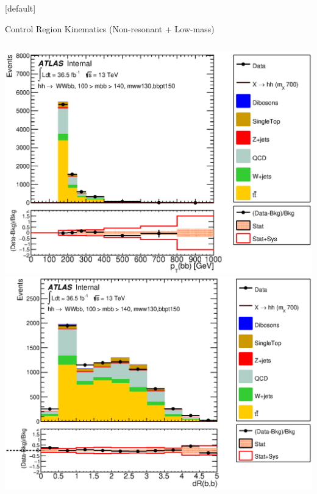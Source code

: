 \documentclass{beamer}
\begin{document}
{  \makeatletter %
  [default]
  \def\beamer@entrycode{\vspace*{-1.075\headheight}}
  \begin{frame}{Control Region Kinematics (Non-resonant + Low-mass)}
    \vspace{5pt}
    \begin{columns}
      \includegraphics*[width=1.9\textwidth] {../chapters/dihiggs2/figures/ControlPlots/36ifb_CPUpdated_opt700_mBBcr_plots_094/C_mBBcr_opt700ichep_mww_bbpt150_bbPt_regionA_met25d020}\\
      \includegraphics*[width=1.9\textwidth] {../chapters/dihiggs2/figures/ControlPlots/36ifb_CPUpdated_opt700_mBBcr_plots_094/C_mBBcr_opt700ichep_mww_bbpt150_drbb_regionA_met25d020}

\end{columns}
\end{frame}}
\end{document}
